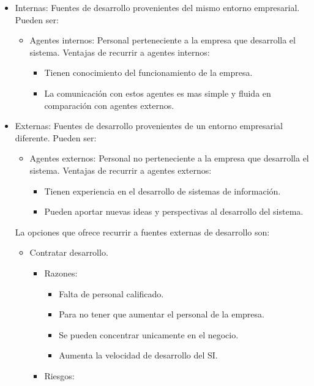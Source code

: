 \documentclass{templateNote}
\begin{document}
\begin{itemize}
    \item Internas: Fuentes de desarrollo provenientes del mismo entorno empresarial. Pueden ser:
    \begin{itemize}
        \item Agentes internos: Personal perteneciente a la empresa que desarrolla el sistema. Ventajas de recurrir a agentes internos:
        \begin{itemize}
            \item Tienen conocimiento del funcionamiento de la empresa.
            \item La comunicación con estos agentes es mas simple y fluida en comparación con agentes externos.
        \end{itemize}
    \end{itemize}
    \item Externas: Fuentes de desarrollo provenientes de un entorno empresarial diferente. Pueden ser:
    \begin{itemize}
        \item Agentes externos: Personal no perteneciente a la empresa que desarrolla el sistema. Ventajas de recurrir a agentes externos:
        \begin{itemize}
            \item Tienen experiencia en el desarrollo de sistemas de información.
            \item Pueden aportar nuevas ideas y perspectivas al desarrollo del sistema.
        \end{itemize}
    \end{itemize}
    La opciones que ofrece recurrir a fuentes externas de desarrollo son:
    \begin{itemize}
        \item Contratar desarrollo.
        \begin{itemize}
            \item Razones:
            \begin{itemize}
                \item Falta de personal calificado.
                \item Para no tener que aumentar el personal de la empresa.
                \item Se pueden concentrar unicamente en el negocio.
                \item Aumenta la velocidad de desarrollo del SI.
            \end{itemize}
            \item Riesgos:

\end{itemize}
\end{itemize}
\end{itemize}
\end{document}
